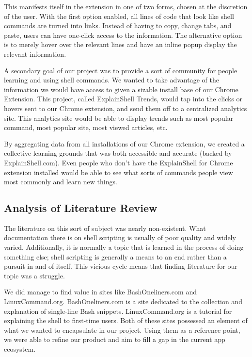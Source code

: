 \documentclass[11pt]{article}
\begin{document}
This manifests itself in the extension in one of two forms, chosen at the
discretion of the user. With the first option enabled, all lines of code that
look like shell commands are turned into links. Instead of having to copy,
change tabs, and paste, users can have one-click access to the information. The
alternative option is to merely hover over the relevant lines and have an inline
popup display the relevant information.

A secondary goal of our project was to provide a sort of community for people
learning and using shell commands. We wanted to take advantage of the
information we would have access to given a sizable install base of our Chrome
Extension. This project, called ExplainShell Trends, would tap into the
clicks or hovers sent to our Chrome extension, and send them off to a
centralized analytics site. This analytics site would be able to display trends
such as most popular command, most popular site, most viewed articles, etc.

By aggregating data from all installations of our Chrome extension, we created a
collective learning grounds that was both accessible and accurate (backed by
ExplainShell.com). Even people who don't have the ExplainShell for Chrome
extension installed would be able to see what sorts of commands people view most
commonly and learn new things.

\subsection{Analysis of Literature Review}

The literature on this sort of subject was nearly non-existent. What
documentation there is on shell scripting is usually of poor quality and widely
varied. Additionally, it is normally a topic that is learned in the process of
doing something else; shell scripting is generally a means to an end rather than
a pursuit in and of itself. This vicious cycle means that finding literature for
our topic was a struggle.

We did manage to find value in sites like BashOneliners.com and
LinuxCommand.org. BashOneliners.com is a site dedicated to the collection and
explanation of single-line Bash snippets. LinuxCommand.org is a tutorial for
explaining the shell to first-time users. Both of these sites possessed an
element of what we wanted to encapsulate in our project. Using them as a
reference point, we were able to refine our product and aim to fill a gap in the
current app ecosystem.
\end{document}
